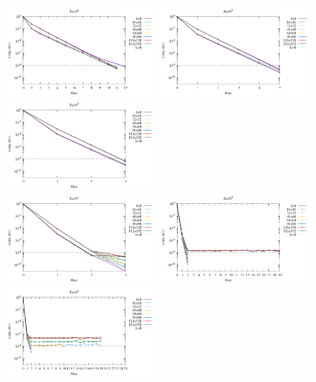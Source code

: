 \begin{center}
\includegraphics[width=5.7cm]{python_codes/fieldstone_161/results/bench2/conv1.pdf}
\includegraphics[width=5.7cm]{python_codes/fieldstone_161/results/bench2/conv2.pdf}
\includegraphics[width=5.7cm]{python_codes/fieldstone_161/results/bench2/conv3.pdf}\\
\includegraphics[width=5.7cm]{python_codes/fieldstone_161/results/bench2/conv4.pdf}
\includegraphics[width=5.7cm]{python_codes/fieldstone_161/results/bench2/conv5.pdf}
\includegraphics[width=5.7cm]{python_codes/fieldstone_161/results/bench2/conv6.pdf}
\end{center}

